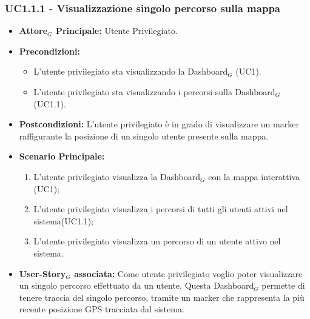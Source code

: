 \documentclass[11pt]{article}
\begin{document}
\begin{justify}
\subsubsection{\textbf{UC1.1.1 - Visualizzazione singolo percorso sulla mappa}}
\label{UC1.1.1}
\begin{itemize}
     \item \textbf{Attore$_G$ Principale:} Utente Privilegiato.
     \item \textbf{Precondizioni:}
        \begin{itemize}
    		\item L'utente privilegiato sta visualizzando la Dashboard$_G$ (UC1).
    		\item L'utente privilegiato sta visualizzando i percorsi sulla Dashboard$_G$ (UC1.1).
        \end{itemize}
     \item \textbf{Postcondizioni:} L'utente privilegiato è in grado di visualizzare un marker raffigurante la posizione di un singolo utente presente sulla mappa.
     \item \textbf{Scenario Principale:}
        \begin{enumerate}
            \item L'utente privilegiato visualizza la Dashboard$_G$ con la mappa interattiva (UC1);
            \item L'utente privilegiato visualizza i percorsi di tutti gli utenti attivi nel sistema(UC1.1);
            \item L'utente privilegiato visualizza un percorso di un utente attivo nel sistema.
        \end{enumerate}
     \item \textbf{User-Story$_G$ associata:}
     Come utente privilegiato voglio poter visualizzare un singolo percorso effettuato da un utente. Questa Dashboard$_G$ permette di tenere traccia del singolo percorso, tramite un marker che rappresenta la più recente posizione GPS tracciata dal sistema.
\end{itemize}

\end{justify}
\end{document}
